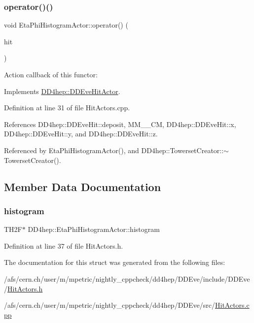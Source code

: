 \subsubsection{\texorpdfstring{operator()()}{operator()()}}
{\footnotesize\ttfamily void Eta\+Phi\+Histogram\+Actor\+::operator() (\begin{DoxyParamCaption}\item[{const \hyperlink{class_d_d4hep_1_1_d_d_eve_hit}{D\+D\+Eve\+Hit} \&}]{hit }\end{DoxyParamCaption})\hspace{0.3cm}{\ttfamily [virtual]}}



Action callback of this functor\+: 



Implements \hyperlink{struct_d_d4hep_1_1_d_d_eve_hit_actor_a612a0a84bfe41620203555b044019788}{D\+D4hep\+::\+D\+D\+Eve\+Hit\+Actor}.



Definition at line 31 of file Hit\+Actors.\+cpp.



References D\+D4hep\+::\+D\+D\+Eve\+Hit\+::deposit, M\+M\+\_\+\_\+\+CM, D\+D4hep\+::\+D\+D\+Eve\+Hit\+::x, D\+D4hep\+::\+D\+D\+Eve\+Hit\+::y, and D\+D4hep\+::\+D\+D\+Eve\+Hit\+::z.



Referenced by Eta\+Phi\+Histogram\+Actor(), and D\+D4hep\+::\+Towerset\+Creator\+::$\sim$\+Towerset\+Creator().



\subsection{Member Data Documentation}
\hypertarget{struct_d_d4hep_1_1_eta_phi_histogram_actor_abe7d6a7db6da3c8ee5c77d718c39b2e0}{}\label{struct_d_d4hep_1_1_eta_phi_histogram_actor_abe7d6a7db6da3c8ee5c77d718c39b2e0} 
\subsubsection{\texorpdfstring{histogram}{histogram}}
{\footnotesize\ttfamily T\+H2F$\ast$ D\+D4hep\+::\+Eta\+Phi\+Histogram\+Actor\+::histogram}



Definition at line 37 of file Hit\+Actors.\+h.



The documentation for this struct was generated from the following files\+:\begin{DoxyCompactItemize}
\item 
/afs/cern.\+ch/user/m/mpetric/nightly\+\_\+cppcheck/dd4hep/\+D\+D\+Eve/include/\+D\+D\+Eve/\hyperlink{_hit_actors_8h}{Hit\+Actors.\+h}\item 
/afs/cern.\+ch/user/m/mpetric/nightly\+\_\+cppcheck/dd4hep/\+D\+D\+Eve/src/\hyperlink{_hit_actors_8cpp}{Hit\+Actors.\+cpp}\end{DoxyCompactItemize}
